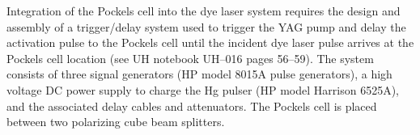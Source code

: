 Integration of the Pockels cell into the dye laser system requires the design and assembly of a trigger/delay system used to trigger the YAG pump and delay the activation pulse to the Pockels cell until the incident dye laser pulse arrives at the Pockels cell location (see UH notebook UH--016 pages 56--59). The system consists of three signal generators (HP model 8015A pulse generators), a high voltage DC power supply to charge the Hg pulser (HP model Harrison 6525A), and the associated delay cables and attenuators. The Pockels cell is placed between two polarizing cube beam splitters.
